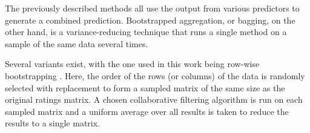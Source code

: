 \documentclass[10pt,conference,compsocconf]{IEEEtran}
\begin{document}

The previously described methods all use the output from various predictors to generate a combined prediction. Bootstrapped aggregation, or bagging, on the other hand, is a variance-reducing technique that runs a single method on a sample of the same data several times.

Several variants exist, with the one used in this work being row-wise bootstrapping \cite[Chapter~6.3.2]{Aggarwal2016}. Here, the order of the rows (or columns) of the data is randomly selected with replacement to form a sampled matrix of the same size as the original ratings matrix. A chosen collaborative filtering algorithm is run on each sampled matrix and a uniform average over all results is taken to reduce the results to a single matrix.





\end{document}
